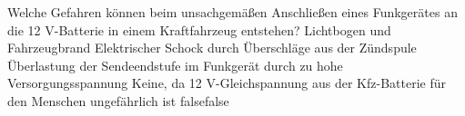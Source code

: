     {Welche Gefahren können beim unsachgemäßen Anschließen eines Funkgerätes an die 12 V-Batterie in einem Kraftfahrzeug entstehen?}
    {Lichtbogen und Fahrzeugbrand}
    {Elektrischer Schock durch Überschläge aus der Zündspule}
    {Überlastung der Sendeendstufe im Funkgerät durch zu hohe Versorgungsspannung}
    {Keine, da 12 V-Gleichspannung aus der Kfz-Batterie für den Menschen ungefährlich ist}
    {false}{false}